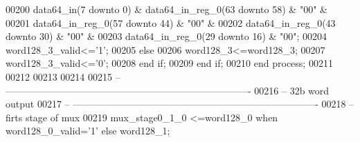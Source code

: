 \begin{DoxyCode}
00200                         \textcolor{vhdlchar}{data64_in}\textcolor{vhdlchar}{(}\textcolor{vhdllogic}{}\textcolor{vhdllogic}{7} \textcolor{keywordflow}{downto} \textcolor{vhdllogic}{}\textcolor{vhdllogic}{0}\textcolor{vhdlchar}{)} \textcolor{vhdlchar}{&} \textcolor{vhdlchar}{data64_in_reg_0}\textcolor{vhdlchar}{(}\textcolor{vhdllogic}{}\textcolor{vhdllogic}{63} \textcolor{keywordflow}{downto} \textcolor{vhdllogic}{}\textcolor{vhdllogic}{58}\textcolor{vhdlchar}{)} \textcolor{vhdlchar}{&} \textcolor{vhdllogic}{"00"} \textcolor{vhdlchar}{&}
00201                         \textcolor{vhdlchar}{data64_in_reg_0}\textcolor{vhdlchar}{(}\textcolor{vhdllogic}{}\textcolor{vhdllogic}{57} \textcolor{keywordflow}{downto} \textcolor{vhdllogic}{}\textcolor{vhdllogic}{44}\textcolor{vhdlchar}{)} \textcolor{vhdlchar}{&} \textcolor{vhdllogic}{"00"} \textcolor{vhdlchar}{&} 
00202                         \textcolor{vhdlchar}{data64_in_reg_0}\textcolor{vhdlchar}{(}\textcolor{vhdllogic}{}\textcolor{vhdllogic}{43} \textcolor{keywordflow}{downto} \textcolor{vhdllogic}{}\textcolor{vhdllogic}{30}\textcolor{vhdlchar}{)} \textcolor{vhdlchar}{&} \textcolor{vhdllogic}{"00"} \textcolor{vhdlchar}{&} 
00203                         \textcolor{vhdlchar}{data64_in_reg_0}\textcolor{vhdlchar}{(}\textcolor{vhdllogic}{}\textcolor{vhdllogic}{29} \textcolor{keywordflow}{downto} \textcolor{vhdllogic}{}\textcolor{vhdllogic}{16}\textcolor{vhdlchar}{)} \textcolor{vhdlchar}{&} \textcolor{vhdllogic}{"00"};
00204             \textcolor{vhdlchar}{word128_3_valid}\textcolor{vhdlchar}{<=}\textcolor{vhdlchar}{'}\textcolor{vhdllogic}{}\textcolor{vhdllogic}{1}\textcolor{vhdlchar}{'};
00205             \textcolor{keywordflow}{else} 
00206                 \textcolor{vhdlchar}{word128_3}\textcolor{vhdlchar}{<=}\textcolor{vhdlchar}{word128_3};
00207             \textcolor{vhdlchar}{word128_3_valid}\textcolor{vhdlchar}{<=}\textcolor{vhdlchar}{'}\textcolor{vhdllogic}{}\textcolor{vhdllogic}{0}\textcolor{vhdlchar}{'};
00208             \textcolor{keywordflow}{end} \textcolor{keywordflow}{if};
00209         \textcolor{keywordflow}{end} \textcolor{keywordflow}{if};
00210     \textcolor{keywordflow}{end} \textcolor{keywordflow}{process};
00211 
00212 
00213      
00214 
00215 \textcolor{keyword}{-- ----------------------------------------------------------------------------}
00216 \textcolor{keyword}{-- 32b word output}
00217 \textcolor{keyword}{-- ----------------------------------------------------------------------------}
00218 \textcolor{keyword}{--firts stage of mux}
00219 \textcolor{vhdlchar}{mux_stage0_1_0}  \textcolor{vhdlchar}{<=}\textcolor{vhdlchar}{word128_0} \textcolor{keywordflow}{when} \textcolor{vhdlchar}{word128_0_valid}\textcolor{vhdlchar}{=}\textcolor{vhdlchar}{'}\textcolor{vhdllogic}{}\textcolor{vhdllogic}{1}\textcolor{vhdlchar}{'} \textcolor{keywordflow}{else} \textcolor{vhdlchar}{word128_1};

\end{DoxyCode}
